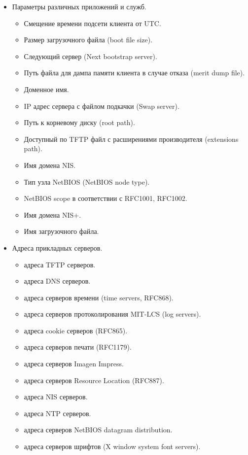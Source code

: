 \documentclass[14pt,a4paper]{extarticle}
\begin{document}
\begin{itemize}
\begin{itemize}
    \end{itemize}
    \item Параметры различных приложений и служб.
    \begin{itemize}
        \item Смещение времени подсети клиента от UTC.
        \item Размер загрузочного файла (boot file size).
        \item Следующий сервер (Next bootstrap server).
        \item Путь файла для дампа памяти клиента в случае отказа (merit dump file).
        \item Доменное имя.
        \item IP адрес сервера с файлом подкачки (Swap server).
        \item Путь к корневому диску (root path).
        \item Доступный по TFTP файл с расширениями производителя (extensions path).
        \item Имя домена NIS.
        \item Тип узла NetBIOS (NetBIOS node type).
        \item NetBIOS scope в соответствии с RFC1001, RFC1002.
        \item Имя домена NIS+.
        \item Имя загрузочного файла.
    \end{itemize}
    \item Адреса прикладных серверов.
    \begin{itemize}
        \item адреса TFTP серверов.
        \item адреса DNS серверов.
        \item адреса серверов времени (time servers, RFC868).
        \item адреса серверов протоколирования MIT-LCS (log servers).
        \item адреса cookie серверов (RFC865).
        \item адреса серверов печати (RFC1179).
        \item адреса серверов Imagen Impress.
        \item адреса серверов Resource Location (RFC887).
        \item адреса NIS серверов.
        \item адреса NTP серверов.
        \item адреса серверов NetBIOS datagram distribution.
        \item адреса серверов шрифтов (X window system font servers).

\end{itemize}
\end{itemize}
\end{document}

